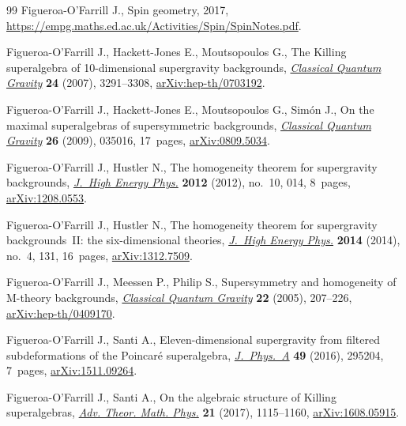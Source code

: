 \documentclass[pdftex]{sigma}
\numberwithin{equation}{section}
\newcommand{\1}{\mathbbm{1}}
\begin{document}
\begin{thebibliography}{99}
Figueroa-O'Farrill J., Spin geometry, 2017,  \url{https://empg.maths.ed.ac.uk/Activities/Spin/SpinNotes.pdf}.

Figueroa-O'Farrill J., Hackett-Jones E., Moutsopoulos G., The {K}illing
 superalgebra of 10-dimensional supergravity backgrounds,
 \href{https://doi.org/10.1088/0264-9381/24/13/010}{\textit{Classical Quantum
 Gravity}} \textbf{24} (2007), 3291--3308,
 \href{http://arxiv.org/abs/hep-th/0703192}{arXiv:hep-th/0703192}.

Figueroa-O'Farrill J., Hackett-Jones E., Moutsopoulos G., Sim\'on J., On the
 maximal superalgebras of supersymmetric backgrounds,
 \href{https://doi.org/10.1088/0264-9381/26/3/035016}{\textit{Classical
 Quantum Gravity}} \textbf{26} (2009), 035016, 17~pages,
 \href{http://arxiv.org/abs/0809.5034}{arXiv:0809.5034}.

Figueroa-O'Farrill J., Hustler N., The homogeneity theorem for supergravity
 backgrounds, \href{https://doi.org/10.1007/jhep10(2012)014}{\textit{J.~High
 Energy Phys.}} \textbf{2012} (2012), no.~10, 014, 8~pages,
 \href{http://arxiv.org/abs/1208.0553}{arXiv:1208.0553}.

Figueroa-O'Farrill J., Hustler N., The homogeneity theorem for supergravity
 backgrounds~{II}: the six-dimensional theories,
 \href{https://doi.org/10.1007/JHEP04(2014)131}{\textit{J.~High Energy Phys.}}
 \textbf{2014} (2014), no.~4, 131, 16~pages,
 \href{http://arxiv.org/abs/1312.7509}{arXiv:1312.7509}.

Figueroa-O'Farrill J., Meessen P., Philip S., Supersymmetry and homogeneity of
 {M}-theory backgrounds,
 \href{https://doi.org/10.1088/0264-9381/22/1/014}{\textit{Classical Quantum
 Gravity}} \textbf{22} (2005), 207--226,
 \href{http://arxiv.org/abs/hep-th/0409170}{arXiv:hep-th/0409170}.

Figueroa-O'Farrill J., Santi A., Eleven-dimensional supergravity from filtered
 subdeformations of the {P}oincar\'e superalgebra,
 \href{https://doi.org/10.1088/1751-8113/49/29/295204}{\textit{J.~Phys.~A}}
 \textbf{49} (2016), 295204, 7~pages,
 \href{http://arxiv.org/abs/1511.09264}{arXiv:1511.09264}.

Figueroa-O'Farrill J., Santi A., On the algebraic structure of {K}illing
 superalgebras,
 \href{https://doi.org/10.4310/ATMP.2017.v21.n5.a1}{\textit{Adv. Theor. Math.
 Phys.}} \textbf{21} (2017), 1115--1160,
 \href{http://arxiv.org/abs/1608.05915}{arXiv:1608.05915}.


\end{thebibliography}
\end{document}
